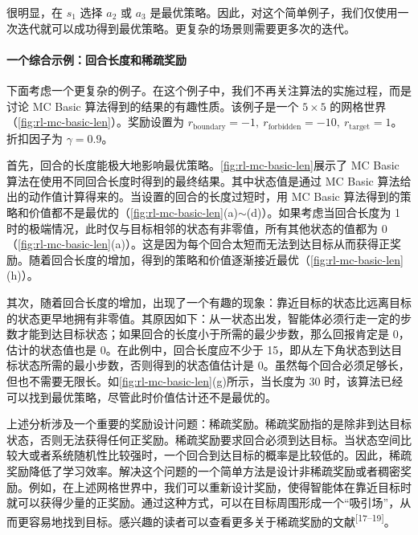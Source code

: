很明显，在 $s_1$ 选择 $a_2$ 或 $a_3$ 是最优策略。因此，对这个简单例子，我们仅使用一次迭代就可以成功得到最优策略。更复杂的场景则需要更多次的迭代。

\paragraph{一个综合示例：回合长度和稀疏奖励}
下面考虑一个更复杂的例子。在这个例子中，我们不再关注算法的实施过程，而是讨论 MC Basic 算法得到的结果的有趣性质。该例子是一个 $5 \times 5$ 的网格世界（\cref{fig:rl-mc-basic-len}）。奖励设置为 $r_{\mathrm{boundary}} = -1,\ r_{\mathrm{forbidden}} = -10,\ r_{\mathrm{target}} = 1$。折扣因子为 $\gamma = 0.9$。

首先，回合的长度能极大地影响最优策略。\cref{fig:rl-mc-basic-len}展示了 MC Basic 算法在使用不同回合长度时得到的最终结果。其中状态值是通过 MC Basic 算法给出的动作值计算得来的。当设置的回合的长度过短时，用 MC Basic 算法得到的策略和价值都不是最优的（\cref{fig:rl-mc-basic-len}(a)$\sim$(d)）。如果考虑当回合长度为 1 时的极端情况，此时仅与目标相邻的状态有非零值，所有其他状态的值都为 0（\cref{fig:rl-mc-basic-len}(a)）。这是因为每个回合太短而无法到达目标从而获得正奖励。随着回合长度的增加，得到的策略和价值逐渐接近最优（\cref{fig:rl-mc-basic-len}(h)）。

其次，随着回合长度的增加，出现了一个有趣的现象：靠近目标的状态比远离目标的状态更早地拥有非零值。其原因如下：从一状态出发，智能体必须行走一定的步数才能到达目标状态；如果回合的长度小于所需的最少步数，那么回报肯定是 0，估计的状态值也是 0。在此例中，回合长度应不少于 15，即从左下角状态到达目标状态所需的最小步数，否则得到的状态值估计是 0。虽然每个回合必须足够长，但也不需要无限长。如\cref{fig:rl-mc-basic-len}(g)所示，当长度为 30 时，该算法已经可以找到最优策略，尽管此时价值估计还不是最优的。

上述分析涉及一个重要的奖励设计问题：稀疏奖励。稀疏奖励指的是除非到达目标状态，否则无法获得任何正奖励。稀疏奖励要求回合必须到达目标。当状态空间比较大或者系统随机性比较强时，一个回合到达目标的概率是比较低的。因此，稀疏奖励降低了学习效率。解决这个问题的一个简单方法是设计非稀疏奖励或者稠密奖励。例如，在上述网格世界中，我们可以重新设计奖励，使得智能体在靠近目标时就可以获得少量的正奖励。通过这种方式，可以在目标周围形成一个“吸引场”，从而更容易地找到目标。感兴趣的读者可以查看更多关于稀疏奖励的文献\textsuperscript{[17--19]}。

